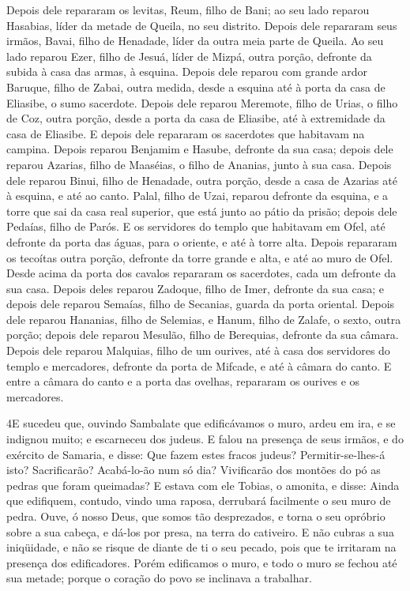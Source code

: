 Depois dele repararam os levitas, Reum, filho de Bani; ao seu
lado reparou Hasabias, líder da metade de Queila, no seu distrito.
Depois dele repararam seus irmãos, Bavai, filho de Henadade,
líder da outra meia parte de Queila. Ao seu lado reparou
Ezer, filho de Jesuá, líder de Mizpá, outra porção, defronte da
subida à casa das armas, à esquina. Depois dele reparou com
grande ardor Baruque, filho de Zabai, outra medida, desde a esquina
até à porta da casa de Eliasibe, o sumo sacerdote. Depois
dele reparou Meremote, filho de Urias, o filho de Coz, outra porção,
desde a porta da casa de Eliasibe, até à extremidade da casa de
Eliasibe. E depois dele repararam os sacerdotes que habitavam
na campina. Depois reparou Benjamim e Hasube, defronte da sua
casa; depois dele reparou Azarias, filho de Maaséias, o filho de
Ananias, junto à sua casa. Depois dele reparou Binui, filho
de Henadade, outra porção, desde a casa de Azarias até à esquina, e
até ao canto. Palal, filho de Uzai, reparou defronte da
esquina, e a torre que sai da casa real superior, que está junto ao
pátio da prisão; depois dele Pedaías, filho de Parós. E os
servidores do templo que habitavam em Ofel, até defronte da porta
das águas, para o oriente, e até à torre alta. Depois
repararam os tecoítas outra porção, defronte da torre grande e alta,
e até ao muro de Ofel. Desde acima da porta dos cavalos
repararam os sacerdotes, cada um defronte da sua casa. Depois
deles reparou Zadoque, filho de Imer, defronte da sua casa; e depois
dele reparou Semaías, filho de Secanias, guarda da porta oriental.
Depois dele reparou Hananias, filho de Selemias, e Hanum,
filho de Zalafe, o sexto, outra porção; depois dele reparou Mesulão,
filho de Berequias, defronte da sua câmara. Depois dele
reparou Malquias, filho de um ourives, até à casa dos servidores do
templo e mercadores, defronte da porta de Mifcade, e até à câmara do
canto. E entre a câmara do canto e a porta das ovelhas,
repararam os ourives e os mercadores.

\medskip

\lettrine{4} E sucedeu que, ouvindo Sambalate que edificávamos
o muro, ardeu em ira, e se indignou muito; e escarneceu dos judeus.
E falou na presença de seus irmãos, e do exército de Samaria, e
disse: Que fazem estes fracos judeus? Permitir-se-lhes-á isto?
Sacrificarão? Acabá-lo-ão num só dia? Vivificarão dos montões do pó
as pedras que foram queimadas? E estava com ele Tobias, o
amonita, e disse: Ainda que edifiquem, contudo, vindo uma raposa,
derrubará facilmente o seu muro de pedra. Ouve, ó nosso Deus,
que somos tão desprezados, e torna o seu opróbrio sobre a sua
cabeça, e dá-los por presa, na terra do cativeiro. E não cubras
a sua iniqüidade, e não se risque de diante de ti o seu pecado, pois
que te irritaram na presença dos edificadores. Porém edificamos
o muro, e todo o muro se fechou até sua metade; porque o coração do
povo se inclinava a trabalhar.

